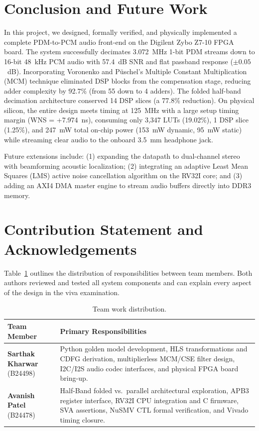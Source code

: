 \documentclass[11pt,a4paper]{article}
\newcommand{\studentA}{Sarthak Kharwar}
\newcommand{\studentB}{Avanish Patel}
\begin{document}
\section{Conclusion and Future Work}
\label{sec:conclusion}

In this project, we designed, formally verified, and physically implemented a complete PDM-to-PCM audio front-end on the Digilent Zybo Z7-10 FPGA board. The system successfully decimates 3.072~MHz 1-bit PDM streams down to 16-bit 48~kHz PCM audio with 57.4~dB SNR and flat passband response ($\pm 0.05$~dB). Incorporating Voronenko and P\"uschel's Multiple Constant Multiplication (MCM) technique eliminated DSP blocks from the compensation stage, reducing adder complexity by 92.7\% (from 55 down to 4 adders). The folded half-band decimation architecture conserved 14 DSP slices (a 77.8\% reduction). On physical silicon, the entire design meets timing at 125~MHz with a large setup timing margin (WNS = +7.974~ns), consuming only 3,347 LUTs (19.02\%), 1 DSP slice (1.25\%), and 247~mW total on-chip power (153~mW dynamic, 95~mW static) while streaming clear audio to the onboard 3.5~mm headphone jack.

Future extensions include: (1) expanding the datapath to dual-channel stereo with beamforming acoustic localization; (2) integrating an adaptive Least Mean Squares (LMS) active noise cancellation algorithm on the RV32I core; and (3) adding an AXI4 DMA master engine to stream audio buffers directly into DDR3 memory.

\section*{Contribution Statement and Acknowledgements}
\label{sec:contrib}

Table~\ref{tab:contrib} outlines the distribution of responsibilities between team members. Both authors reviewed and tested all system components and can explain every aspect of the design in the viva examination.

\begin{table}[H]\centering\small
\caption{Team work distribution.}\label{tab:contrib}
\begin{tabularx}{\linewidth}{@{}lX@{}}
\toprule
Team Member & Primary Responsibilities\\
\midrule
\textbf{\studentA} (B24498) & Python golden model development, HLS transformations and CDFG derivation, multiplierless MCM/CSE filter design, I2C/I2S audio codec interfaces, and physical FPGA board bring-up.\\
\textbf{\studentB} (B24478) & Half-Band folded vs.\ parallel architectural exploration, APB3 register interface, RV32I CPU integration and C firmware, SVA assertions, NuSMV CTL formal verification, and Vivado timing closure.\\
\bottomrule
\end{tabularx}
\end{table}
\end{document}
